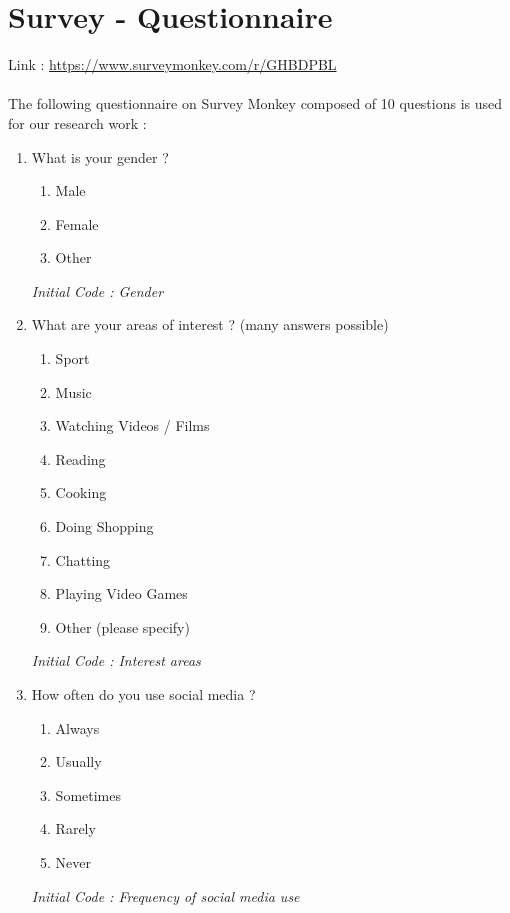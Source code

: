 \documentclass[conference]{IEEEtran}
\begin{document}
\section{Survey - Questionnaire}

Link : \hyperlink{https://www.surveymonkey.com/r/GHBDPBL}{https://www.surveymonkey.com/r/GHBDPBL}


\paragraph{}
The following questionnaire on Survey Monkey composed of 10 questions is used for our research work :

\begin{enumerate}
    \setlength\itemsep{1em}
    \item What is your gender ?
    \begin{enumerate}
        \item Male
        \item Female
        \item Other
    \end{enumerate}
    \textit{Initial Code : Gender}

    \item What are your areas of interest ? (many answers possible)
    \begin{enumerate}
        \item Sport
        \item Music
        \item Watching Videos / Films
        \item Reading
        \item Cooking
        \item Doing Shopping
        \item Chatting
        \item Playing Video Games
        \item Other (please specify)
    \end{enumerate}
    \textit{Initial Code : Interest areas}

    \item How often do you use social media ?
    \begin{enumerate}
        \item Always
        \item Usually
        \item Sometimes
        \item Rarely
        \item Never
    \end{enumerate}
    \textit{Initial Code : Frequency of social media use}


\end{enumerate}
\end{document}
